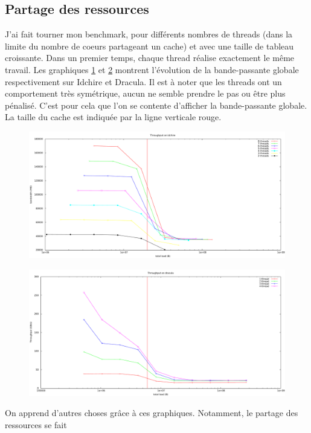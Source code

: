 \documentclass{report}
\begin{document}
\subsection{Partage des ressources}
\label{subsec:ressources}
J'ai fait tourner mon benchmark, pour différents nombres de threads (dans la limite du nombre de coeurs
partageant un cache) et avec une taille de tableau croissante. Dans un premier temps, chaque thread 
réalise exactement le même travail. Les graphiques \ref{fig:idchbench} et \ref{fig:dracbench} 
montrent l'évolution de la bande-passante globale respectivement sur Idchire et Dracula. Il est à 
noter que les threads ont un comportement très symétrique, aucun ne semble prendre le pas ou être
plus pénalisé. C'est pour cela que l'on se contente d'afficher la bande-passante globale. La taille
du cache est indiquée par la ligne verticale rouge.
\begin{figure}
  \includegraphics[width=\linewidth]{bandwidth_idch.pdf}
  \label{fig:idchbench}
\end{figure}
\begin{figure}
  \includegraphics[width=\linewidth]{bench_dracula.pdf}
  \label{fig:dracbench}
\end{figure}
On apprend d'autres choses grâce à ces graphiques. Notamment, le partage des ressources se fait
\end{document}
